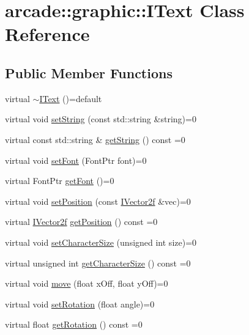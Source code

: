 \hypertarget{classarcade_1_1graphic_1_1_i_text}{}\section{arcade\+::graphic\+::I\+Text Class Reference}
\label{classarcade_1_1graphic_1_1_i_text}
\subsection*{Public Member Functions}
\begin{DoxyCompactItemize}
\item 
virtual \mbox{\hyperlink{classarcade_1_1graphic_1_1_i_text_a311b4292400985ac1b8fe678cc9c639a}{$\sim$\+I\+Text}} ()=default
\item 
virtual void \mbox{\hyperlink{classarcade_1_1graphic_1_1_i_text_a782961b4f818490d05fbffd439fb667e}{set\+String}} (const std\+::string \&string)=0
\item 
virtual const std\+::string \& \mbox{\hyperlink{classarcade_1_1graphic_1_1_i_text_a15a5ef9ed961cd8f4c596f09ce79f694}{get\+String}} () const =0
\item 
virtual void \mbox{\hyperlink{classarcade_1_1graphic_1_1_i_text_afd47effbd52bab68990f16d694b630a6}{set\+Font}} (Font\+Ptr font)=0
\item 
virtual Font\+Ptr \mbox{\hyperlink{classarcade_1_1graphic_1_1_i_text_a6370811bf285da57f7780843d6767ace}{get\+Font}} ()=0
\item 
virtual void \mbox{\hyperlink{classarcade_1_1graphic_1_1_i_text_a26ba9fb577a40e24a08081dd3f79af34}{set\+Position}} (const \mbox{\hyperlink{classarcade_1_1graphic_1_1_i_vector2f}{I\+Vector2f}} \&vec)=0
\item 
virtual \mbox{\hyperlink{classarcade_1_1graphic_1_1_i_vector2f}{I\+Vector2f}} \mbox{\hyperlink{classarcade_1_1graphic_1_1_i_text_a78de4816a5a2f5d8ea85ef30bf5e9a47}{get\+Position}} () const =0
\item 
virtual void \mbox{\hyperlink{classarcade_1_1graphic_1_1_i_text_ac15854bcc1c009286a4148ae53e7aa99}{set\+Character\+Size}} (unsigned int size)=0
\item 
virtual unsigned int \mbox{\hyperlink{classarcade_1_1graphic_1_1_i_text_a7eaa9a7674acefc362d2d1e6e07ae9dd}{get\+Character\+Size}} () const =0
\item 
virtual void \mbox{\hyperlink{classarcade_1_1graphic_1_1_i_text_a1854dd1c560220cba75f132bbcb2c96e}{move}} (float x\+Off, float y\+Off)=0
\item 
virtual void \mbox{\hyperlink{classarcade_1_1graphic_1_1_i_text_ae0fe24a144225c000b6359ff4897f14a}{set\+Rotation}} (float angle)=0
\item 
virtual float \mbox{\hyperlink{classarcade_1_1graphic_1_1_i_text_a814f9412043c8436ffa4614990d4c653}{get\+Rotation}} () const =0
\end{DoxyCompactItemize}


